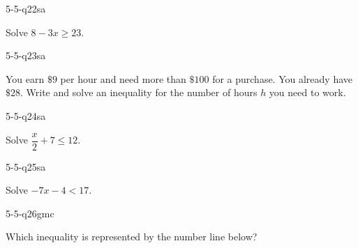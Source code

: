\begin{practiceQuestion}{5-5-q22}{sa}
\begin{questionText}
Solve $8 - 3x \geq 23$.
\end{questionText}
\end{practiceQuestion}

\begin{practiceQuestion}{5-5-q23}{sa}
\begin{questionText}
You earn $\$9$ per hour and need more than $\$100$ for a purchase. You already have $\$28$. Write and solve an inequality for the number of hours $h$ you need to work.
\end{questionText}
\end{practiceQuestion}

\begin{practiceQuestion}{5-5-q24}{sa}
\begin{questionText}
Solve $\dfrac{x}{2} + 7 \leq 12$.
\end{questionText}
\end{practiceQuestion}

\begin{practiceQuestion}{5-5-q25}{sa}
\begin{questionText}
Solve $-7x - 4 < 17$.
\end{questionText}
\end{practiceQuestion}


\begin{practiceQuestion}{5-5-q26}{gmc}
\begin{questionText}
Which inequality is represented by the number line below?

\begin{center}
\end{center}
\end{questionText}
\end{practiceQuestion}

